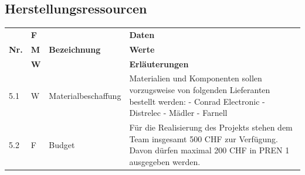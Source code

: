 \documentclass[../main.tex]{subfiles}
\begin{document}
\subsection{Herstellungsressourcen}
\begin{tabular}{|l|p{0.5cm}|p{4cm}|p{10cm}|}
  \hline
               & \textbf{F} &                                  & \textbf{Daten}                                                                                                                                                                                                                                                                                                                                                                                \\
  \textbf{Nr.} & \textbf{M} & \textbf{Bezeichnung}             & \textbf{Werte}                                                                                                                                                                                                                                                                                                                                                                                \\
               & \textbf{W} &                                  & \textbf{Erläuterungen}                                                                                                                                                                                                                                                                                                                                                                        \\
  \hline
  5.1          & W          & Materialbeschaffung              & Materialien und Komponenten sollen vorzugsweise von folgenden Lieferanten bestellt werden: \newline - Conrad Electronic \newline - Distrelec \newline - Mädler \newline - Farnell                                                                                                                                                                                                             \\
  \hline
  5.2          & F          & Budget                           & Für die Realisierung des Projekts stehen dem Team insgesamt 500 CHF zur Verfügung. Davon dürfen maximal 200 CHF in PREN 1 ausgegeben werden.                                                                                                                                                                                                                                                  \\

\end{tabular}
\end{document}
